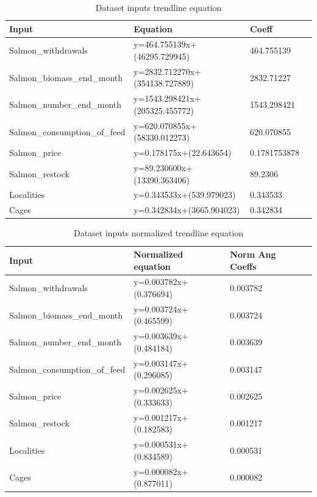 \begin{table}[ht] 
	\centering
    \begin{tabular}{ | l | l | l | p{5cm} |}
        \hline
        Input 								& Equation 							& Coeff			\\ \hline
          	Salmon\_withdrawals 			& y=464.755139x+(46295.729945) 		& 464.755139 	\\ \hline
          	Salmon\_biomass\_end\_month 	& y=2832.712270x+(354138.727889) 	& 2832.71227 	\\ \hline
          	Salmon\_number\_end\_month 		& y=1543.298421x+(205325.455772)	& 1543.298421 	\\ \hline
          	Salmon\_consumption\_of\_feed 	& y=620.070855x+(58330.012273) 		& 620.070855	\\ \hline
           	Salmon\_price 			& y=0.178175x+(22.643654)			& 0.1781753878 		\\ \hline
          	Salmon\_restock 				& y=89.230600x+(13390.363406)		& 89.2306 		\\ \hline
 			Localities 						& y=0.343533x+(539.979023) 			& 0.343533		\\ \hline
  			Cages 							& y=0.342834x+(3665.904023) 		& 0.342834 		\\ \hline
    \end{tabular} 
    \caption{Dataset inputs trendline equation}
    \label{table: trendline} 
\end{table}
\begin{table}[ht] 
	\centering
    \begin{tabular}{ | l | l | l | p{5cm} |}
        \hline
        Input 							& Normalized equation 	& Norm Ang Coeffs	\\ \hline
          	Salmon\_withdrawals 		& y=0.003782x+(0.376694)& 0.003782			\\ \hline
          	Salmon\_biomass\_end\_month & y=0.003724x+(0.465599)& 0.003724			\\ \hline
          	Salmon\_number\_end\_month 	& y=0.003639x+(0.484184)& 0.003639			\\ \hline
          	Salmon\_consumption\_of\_feed & y=0.003147x+(0.296085)& 0.003147		\\ \hline
           	Salmon\_price 		& y=0.002625x+(0.333633)
& 0.002625			\\ \hline
          	Salmon\_restock 			& y=0.001217x+(0.182583)& 0.001217			\\ \hline
 			Localities 					& y=0.000531x+(0.834589)& 0.000531			\\ \hline
  			Cages 						& y=0.000082x+(0.877011)& 0.000082			\\ \hline
    \end{tabular} 
    \caption{Dataset inputs normalized trendline equation}
    \label{table: norm_trendline} 
\end{table}

